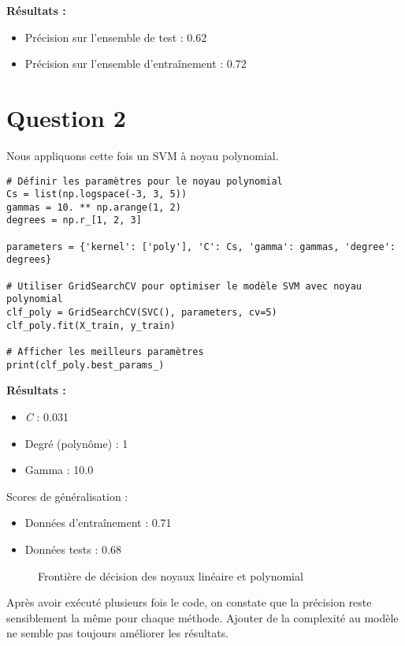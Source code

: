 \documentclass[a4paper,12pt]{article}
\begin{document}
\textbf{Résultats :}

\begin{itemize}
    \item Précision sur l'ensemble de test : 0.62
    \item Précision sur l'ensemble d'entraînement : 0.72
\end{itemize}

\section*{Question 2}

Nous appliquons cette fois un SVM à noyau polynomial.

\begin{verbatim}
# Définir les paramètres pour le noyau polynomial
Cs = list(np.logspace(-3, 3, 5))
gammas = 10. ** np.arange(1, 2)
degrees = np.r_[1, 2, 3]

parameters = {'kernel': ['poly'], 'C': Cs, 'gamma': gammas, 'degree': degrees}

# Utiliser GridSearchCV pour optimiser le modèle SVM avec noyau polynomial
clf_poly = GridSearchCV(SVC(), parameters, cv=5)
clf_poly.fit(X_train, y_train)

# Afficher les meilleurs paramètres
print(clf_poly.best_params_)
\end{verbatim}

\textbf{Résultats :}

\begin{itemize}
    \item \textit{C} : 0.031
    \item Degré (polynôme) : 1
    \item Gamma : 10.0
\end{itemize}

Scores de généralisation :
\begin{itemize}
    \item Données d'entraînement : 0.71
    \item Données tests : 0.68
\end{itemize}


\begin{figure}[H]
\centering

\caption{Frontière de décision des noyaux linéaire et polynomial}
\end{figure}

Après avoir exécuté plusieurs fois le code, on constate que la précision reste sensiblement la même pour chaque méthode. Ajouter de la complexité au modèle ne semble pas toujours améliorer les résultats.
\end{document}
